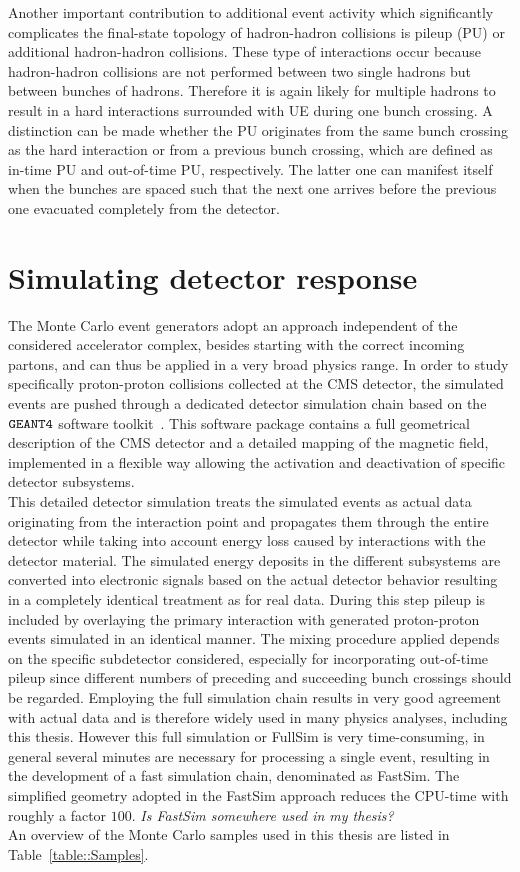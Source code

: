 Another important contribution to additional event activity which significantly complicates the final-state topology of hadron-hadron collisions is pileup (PU) or additional hadron-hadron collisions. These type of interactions occur because hadron-hadron collisions are not performed between two single hadrons but between bunches of hadrons. Therefore it is again likely for multiple hadrons to result in a hard interactions surrounded with UE during one bunch crossing. A distinction can be made whether the PU originates from the same bunch crossing as the hard interaction or from a previous bunch crossing, which are defined as in-time PU and out-of-time PU, respectively. The latter one can manifest itself when the bunches are spaced such that the next one arrives before the previous one evacuated completely from the detector.

\section{Simulating detector response} \label{sec::DetectorSim} %
The Monte Carlo event generators adopt an approach independent of the considered accelerator complex, besides starting with the correct incoming partons, and can thus be applied in a very broad physics range. In order to study specifically proton-proton collisions collected at the CMS detector, the simulated events are pushed through a dedicated detector simulation chain based on the $\texttt{GEANT4}$ software toolkit~\cite{}. This software package contains a full geometrical description of the CMS detector and a detailed mapping of the magnetic field, implemented in a flexible way allowing the activation and deactivation of specific detector subsystems.
\\
This detailed detector simulation treats the simulated events as actual data originating from the interaction point and propagates them through the entire detector while taking into account energy loss caused by interactions with the detector material. 
The simulated energy deposits in the different subsystems are converted into electronic signals based on the actual detector behavior resulting in a completely identical treatment as for real data.
During this step pileup is included by overlaying the primary interaction with generated proton-proton events simulated in an identical manner. 
The mixing procedure applied depends on the specific subdetector considered, especially for incorporating out-of-time pileup since different numbers of preceding and succeeding bunch crossings should be regarded.
Employing the full simulation chain results in very good agreement with actual data and is therefore widely used in many physics analyses, including this thesis. However this full simulation or FullSim is very time-consuming, in general several minutes are necessary for processing a single event, resulting in the development of a fast simulation chain, denominated as FastSim. 
The simplified geometry adopted in the FastSim approach reduces the CPU-time with roughly a factor $100$.
\textit{Is FastSim somewhere used in my thesis?}\\
An overview of the Monte Carlo samples used in this thesis are listed in Table~\ref{table::Samples}.


